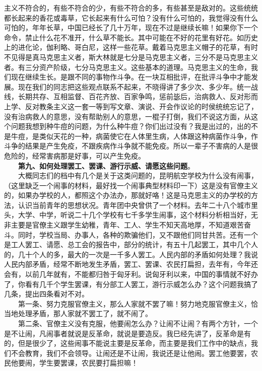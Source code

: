 \documentclass[cn,11pt,chinese]{elegantbook}
\begin{document}
主义不符合的，有些不符合的少，有些不符合的多，有些甚至是敌对的。这些统统都长起来的香花或毒草，它长起来有什么可怕？没有什么可怕的，我觉得没有什么可怕的，年年长草，中国已经长了几十万年，现在不过是继续长嘛！如果你下一个命令，禁止什么花不准开，什么草不能长。其中可能在不好的花里有好花。如历史上的进化论，伽利略、哥白尼，这样一些花草。戴着马克思主义帽子的花草，有时不见得是真马克思主义者，斯大林就是七分是马克思主义者，三分不是马克思主义者。有三分资产阶级，七分马克思主义。这些基本的道理。马克思主义的生命，我们现在继续生长。是跟不同的事物作斗争。在一块互相批评，在批评斗争中才能发展。现在我们的同志把这些观点联系不起来，不晓得讲了多少次、多少年。统一战线，长期共存、互相监督、百花齐放、百家争鸣，惩前毖后，治病救人、反对形而上学、反对教条主义这一套一等到写文章、演说、开会作议论的时侯统统忘记了，没有治病救人的意思，没有帮助别人的意思，一棍子打倒，我们不说这方面，从这个问题我想到种牛痘的问题，为什么种牛痘？你们出过没有？我是出过的，出的不是牛痘，是类似天花的一种，病菌使它在人体里生病，人体跟这种病菌作斗争，作斗争的结果是产生免疫，不跟疾病作斗争就不能免疫。所以一辈子不害病的人是很危险的，经常害病那是好事，可以产生免疫。\\
　　\textbf{第九、如何处理罢工、罢课、游行示威、请愿这些问题}。\\
　　大概同志们的档中有几个是关于这类问题的，昆明航空学校为什么没有闹事，（这里缺乏一个闹事的材料，最好找一个闹事典型材料印一下）这是没有官僚主义的，如果办学校的人，都照这个办法办，那就好咯！这是马克思主义的办学校的方法，认识当前青年的思想状况。青年团中央曾供了一个材料。去年二十八个城市里头，大学、中学，听说二十几个学校有七千多学生闹事，这个材料分析相当好，无非主要是官僚主义跟学生幼稚，青年、工人、学生不知天高地厚，不知道艰苦奋斗。同时，学校当局、办事人，各种的欺骗他们，又不跟他们同甘共苦。还有一个是工人罢工、请愿、总工会的报告中，部分的统计，有五十几起罢工，其中几个人的，几十个人的多，最大的一次是一千多人罢工。人民内部的矛盾如何处理？我说人民内部矛盾，经常不断地发生矛盾，罢工、罢课、农民打扁担，去年有，今年还会有，以前几年就有，不能都归咎于匈牙利。说匈牙利以来，中国的事情就不好办了，你看有几千个学生罢课，有分部工人罢工，游行示威怎么办？这个问题我搞了几条，提出四条看对不对。\\
　　第一条、努力克服官僚主义，那么人家就不罢了嘛！努力地克服官僚主义，恰当地处理矛盾，那人家就不罢工了，就不闹了。\\
　　第二条、官僚主义没有克服，他要闹怎么办？让闹不让闹？有两个方针，一个是不让闹，凡闹事者就说是反革命，就说是要造反。我巳经先讲了，反革命是有的，但是很少了，这些闹事不能说主要是反革命，而主要是我们工作中的缺点，我们不会教育，我们不会领导。让闹还是不让闹，我说还是让他闹。罢工他要罢，农民他要闹，学生要罢课，农民要打扁担嘛！\\
\end{document}
